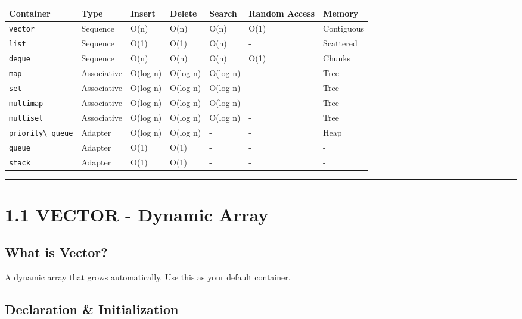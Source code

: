 \begin{longtable}[]{@{}lllllll@{}}
\toprule
Container & Type & Insert & Delete & Search & Random Access & Memory \\
\midrule
\endhead
\passthrough{\lstinline!vector!} & Sequence & O(n) & O(n) & O(n) & O(1)
& Contiguous \\
\passthrough{\lstinline!list!} & Sequence & O(1) & O(1) & O(n) & - &
Scattered \\
\passthrough{\lstinline!deque!} & Sequence & O(n) & O(n) & O(n) & O(1) &
Chunks \\
\passthrough{\lstinline!map!} & Associative & O(log n) & O(log n) &
O(log n) & - & Tree \\
\passthrough{\lstinline!set!} & Associative & O(log n) & O(log n) &
O(log n) & - & Tree \\
\passthrough{\lstinline!multimap!} & Associative & O(log n) & O(log n) &
O(log n) & - & Tree \\
\passthrough{\lstinline!multiset!} & Associative & O(log n) & O(log n) &
O(log n) & - & Tree \\
\passthrough{\lstinline!priority\_queue!} & Adapter & O(log n) & O(log
n) & - & - & Heap \\
\passthrough{\lstinline!queue!} & Adapter & O(1) & O(1) & - & - & - \\
\passthrough{\lstinline!stack!} & Adapter & O(1) & O(1) & - & - & - \\
\bottomrule
\end{longtable}

\begin{center}\rule{0.5\linewidth}{0.5pt}\end{center}

\hypertarget{vector---dynamic-array}{%
\section{1.1 VECTOR - Dynamic Array}\label{vector---dynamic-array}}

\hypertarget{what-is-vector}{%
\subsection{What is Vector?}\label{what-is-vector}}

A dynamic array that grows automatically. Use this as your default
container.

\hypertarget{declaration-initialization}{%
\subsection{Declaration \&
Initialization}\label{declaration-initialization}}

